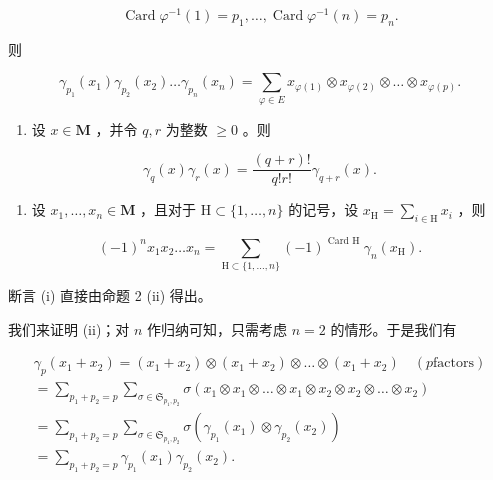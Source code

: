 \[
\operatorname{Card} \varphi^ {- 1} (1) = p _ {1}, \dots , \operatorname{Card} \varphi^ {- 1} (n) = p _ {n}.
\]

则

\[
\gamma_ {p _ {1}} (x _ {1}) \gamma_ {p _ {2}} (x _ {2}) \dots \gamma_ {p _ {n}} (x _ {n}) = \sum_ {\varphi \in E} x _ {\varphi (1)} \otimes x _ {\varphi (2)} \otimes \dots \otimes x _ {\varphi (p)}.
\]

\begin{enumerate}
\def\labelenumi{(\roman{enumi})}
\setcounter{enumi}{3}
\tightlist
\item
  设 \(x \in \mathbf{M}\) ，并令 \(q, r\) 为整数 \(\geqslant 0\) 。则
\end{enumerate}

\[
\gamma_ {q} (x) \gamma_ {r} (x) = \frac {(q + r) !}{q ! r !} \gamma_ {q + r} (x).
\]

\begin{enumerate}
\def\labelenumi{(\alph{enumi})}
\setcounter{enumi}{21}
\tightlist
\item
  设 \(x_{1}, \ldots, x_{n} \in \mathbf{M}\) ，且对于 \(\mathrm{H} \subset \{1, \ldots, n\}\) 的记号，设 \(x_{\mathrm{H}} = \sum_{i \in \mathrm{H}} x_{i}\) ，则
\end{enumerate}

\[
(- 1) ^ {n} x _ {1} x _ {2} \dots x _ {n} = \sum_ {\mathrm{H} \subset \{1, \dots , n \}} (- 1) ^ {\text { Card   H }} \gamma_ {n} (x _ {\mathrm{H}}).
\]

断言 (i) 直接由命题 2 (ii) 得出。

我们来证明 (ii)；对 \(n\) 作归纳可知，只需考虑 \(n = 2\) 的情形。于是我们有

\[
\begin{array}{l} \gamma_ {p} (x _ {1} + x _ {2}) = (x _ {1} + x _ {2}) \otimes (x _ {1} + x _ {2}) \otimes \dots \otimes (x _ {1} + x _ {2}) \quad (p \text {factors}) \\ = \sum_ {p _ {1} + p _ {2} = p} \sum_ {\sigma \in \mathfrak {S} _ {p _ {1}, p _ {2}}} \sigma (x _ {1} \otimes x _ {1} \otimes \dots \otimes x _ {1} \otimes x _ {2} \otimes x _ {2} \otimes \dots \otimes x _ {2}) \\ = \sum_ {p _ {1} + p _ {2} = p} \sum_ {\sigma \in \mathfrak {S} _ {p _ {1}, p _ {2}}} \sigma (\gamma_ {p _ {1}} (x _ {1}) \otimes \gamma_ {p _ {2}} (x _ {2})) \\ = \sum_ {p _ {1} + p _ {2} = p} \gamma_ {p _ {1}} (x _ {1}) \gamma_ {p _ {2}} (x _ {2}). \end{array}
\]

